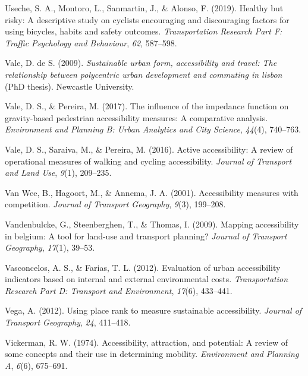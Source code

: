 \documentclass[
11pt, %
oneside, %
english, %
singlespacing, %
]{macthesis} %
\newlength{\cslhangindent}
\newenvironment{CSLReferences}[2] %
{\begin{list}{}{%
	\setlength{\itemindent}{0pt}
	\setlength{\leftmargin}{0pt}
	\setlength{\parsep}{0pt}
	\ifodd #1
	\setlength{\leftmargin}{\cslhangindent}
	\setlength{\itemindent}{-1\cslhangindent}
	\fi
	\setlength{\itemsep}{#2\baselineskip}}}
{\end{list}}
\begin{document}
\begin{CSLReferences}{1}{0}
Useche, S. A., Montoro, L., Sanmartin, J., \& Alonso, F. (2019). Healthy but risky: A descriptive study on cyclists encouraging and discouraging factors for using bicycles, habits and safety outcomes. \emph{Transportation Research Part F: Traffic Psychology and Behaviour}, \emph{62}, 587--598.

Vale, D. de S. (2009). \emph{Sustainable urban form, accessibility and travel: The relationship between polycentric urban development and commuting in lisbon} (PhD thesis). Newcastle University.

Vale, D. S., \& Pereira, M. (2017). The influence of the impedance function on gravity-based pedestrian accessibility measures: A comparative analysis. \emph{Environment and Planning B: Urban Analytics and City Science}, \emph{44}(4), 740--763.

Vale, D. S., Saraiva, M., \& Pereira, M. (2016). Active accessibility: A review of operational measures of walking and cycling accessibility. \emph{Journal of Transport and Land Use}, \emph{9}(1), 209--235.

Van Wee, B., Hagoort, M., \& Annema, J. A. (2001). Accessibility measures with competition. \emph{Journal of Transport Geography}, \emph{9}(3), 199--208.

Vandenbulcke, G., Steenberghen, T., \& Thomas, I. (2009). Mapping accessibility in belgium: A tool for land-use and transport planning? \emph{Journal of Transport Geography}, \emph{17}(1), 39--53.

Vasconcelos, A. S., \& Farias, T. L. (2012). Evaluation of urban accessibility indicators based on internal and external environmental costs. \emph{Transportation Research Part D: Transport and Environment}, \emph{17}(6), 433--441.

Vega, A. (2012). Using place rank to measure sustainable accessibility. \emph{Journal of Transport Geography}, \emph{24}, 411--418.

Vickerman, R. W. (1974). Accessibility, attraction, and potential: A review of some concepts and their use in determining mobility. \emph{Environment and Planning A}, \emph{6}(6), 675--691.


\end{CSLReferences}
\end{document}
